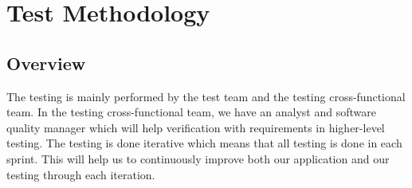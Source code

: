 \section{Test Methodology}
\subsection{Overview}

The testing is mainly performed by the test team and the testing cross-functional team. In the testing cross-functional team, we have an analyst and software quality manager which will help verification with requirements in higher-level testing. The testing is done iterative which means that all testing is done in each sprint. This will help us to continuously improve both our application and our testing through each iteration. \\

